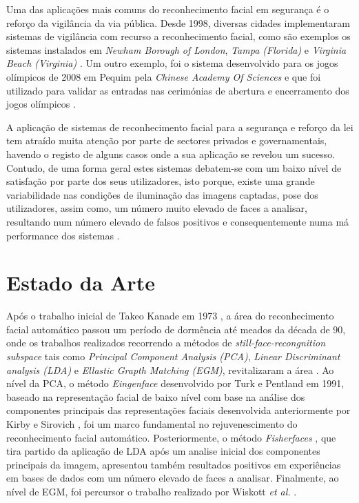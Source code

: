 Uma das aplicações mais comuns do reconhecimento facial em segurança é o reforço da vigilância da via pública. Desde 1998, diversas cidades implementaram sistemas de vigilância com recurso a reconhecimento facial, como são exemplos os sistemas instalados em \textit{Newham Borough of London}, \textit{Tampa (Florida)} e \textit{Virginia Beach (Virginia)} \citep{Li2011}.
Um outro exemplo, foi o sistema desenvolvido para os jogos olímpicos de 2008 em Pequim pela \textit{Chinese Academy Of Sciences} e que foi utilizado para validar as entradas nas cerimónias de abertura e encerramento dos jogos olímpicos \cite{ChineseAcademyOfSciences}.

A aplicação de sistemas de reconhecimento facial para a segurança e reforço da lei tem atraído muita atenção por parte de sectores privados e governamentais, havendo o registo de alguns casos onde a sua aplicação se revelou um sucesso. Contudo, de uma forma geral estes sistemas debatem-se com um baixo nível de satisfação por parte dos seus utilizadores, isto porque, existe uma grande variabilidade nas condições de iluminação das imagens captadas, pose dos utilizadores, assim como, um número muito elevado de faces a analisar, resultando num número elevado de falsos positivos e consequentemente numa má performance dos sistemas \citep{Li2011}.

\section{Estado da Arte}\label{sec:estadodaarte}
Após o trabalho inicial de Takeo Kanade em 1973 \citep{Kanade1973}, a área do reconhecimento facial automático passou um período de dormência até meados da década de 90, onde os trabalhos realizados recorrendo a métodos de \textit{still-face-recongnition subspace} tais como \textit{Principal Component Analysis (PCA)}, \textit{Linear Discriminant analysis (LDA)} e \textit{Ellastic Grapth Matching (EGM)}, revitalizaram a área \citep{Chellappa2010}. Ao nível da PCA, o método
 \textit{Eingenface} \cite{Turk1991} desenvolvido por Turk e Pentland em 1991, baseado na representação facial de baixo nível com base na análise dos componentes principais das representações faciais desenvolvida anteriormente por Kirby e Sirovich  \cite{Kirby1990}, foi um marco fundamental no rejuvenescimento do reconhecimento facial automático. Posteriormente, o método \textit{Fisherfaces} \cite{Belhumeur1997, Etemad1997, Zhao1998}, que tira partido da aplicação de LDA após um analise inicial dos componentes principais da imagem, apresentou também resultados positivos em experiências em bases de dados com um número elevado de faces a analisar. Finalmente, ao nível de EGM, foi percursor o trabalho realizado por Wiskott \textit{et al.} \citep{Wiskott1997}. 
 
